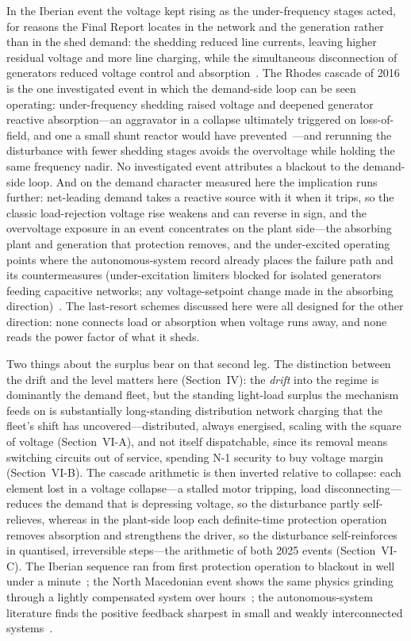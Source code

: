 \documentclass[journal]{IEEEtran}
\begin{document}
In the Iberian event the voltage kept rising as the under-frequency stages acted, for
reasons the Final Report locates in the network and the generation rather than
in the shed demand: the shedding reduced line currents, leaving higher
residual voltage and more line charging, while the simultaneous disconnection
of generators reduced voltage control and absorption~\cite{entsoe_iberia}. The
Rhodes cascade of 2016 is the one investigated event in which the demand-side
loop can be seen operating: under-frequency shedding raised voltage and
deepened generator reactive absorption---an aggravator in a collapse
ultimately triggered on loss-of-field, and one a small shunt reactor would
have prevented~\cite{vournas2021}---and rerunning the disturbance with fewer
shedding stages avoids the overvoltage while holding the same frequency nadir.
No investigated event attributes a blackout to the demand-side loop. And on
the demand character measured here the implication runs further: net-leading
demand takes a reactive source with it when it trips, so the classic
load-rejection voltage rise weakens and can reverse in sign, and the
overvoltage exposure in an event concentrates on the plant side---the
absorbing plant and generation that protection removes, and the under-excited
operating points where the autonomous-system record already places the
failure path and its countermeasures (under-excitation limiters blocked for
isolated generators feeding capacitive networks; any voltage-setpoint change
made in the absorbing direction)~\cite{vournas2021}. The
last-resort schemes discussed here were all designed for the other direction:
none connects load or absorption when voltage runs away, and none reads the
power factor of what it sheds.

Two things about the surplus bear on that second leg. The distinction between
the drift and the level matters here (Section~IV): the \emph{drift} into
the regime is dominantly the demand fleet, but the standing light-load surplus the mechanism feeds on is substantially long-standing distribution network charging that the fleet's shift has uncovered---distributed, always energised, scaling with the
square of voltage (Section~VI-A), and not itself dispatchable, since its removal
means switching circuits out of service, spending N-1 security to buy voltage
margin (Section~VI-B). The cascade arithmetic is then inverted relative to
collapse: each element lost in a voltage collapse---a stalled motor tripping,
load disconnecting---reduces the demand that is depressing voltage, so the
disturbance partly self-relieves, whereas in the plant-side loop each
definite-time protection operation removes absorption and strengthens the
driver, so the disturbance self-reinforces in quantised, irreversible steps---the
arithmetic of both 2025 events (Section~VI-C).
The Iberian sequence ran from first protection operation to blackout in well
under a minute~\cite{entsoe_iberia}; the North Macedonian event shows the same physics grinding through a lightly compensated system over hours~\cite{entsoe_nm}; the autonomous-system literature finds the positive
feedback sharpest in small and weakly interconnected
systems~\cite{vournas2021,psarros2022}.
\end{document}

